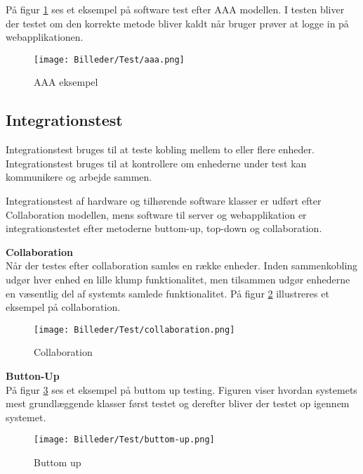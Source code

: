 På  figur \ref{fig:aaa} ses et eksempel på software test efter AAA modellen. I testen bliver der testet om den korrekte metode bliver kaldt når bruger prøver at logge in på webapplikationen. 

\begin{figure}[H]
	\centering
	\texttt{[image: Billeder/Test/aaa.png]}
	\caption{AAA eksempel}
	\label{fig:aaa}
\end{figure}

\newpage

\subsection{Integrationstest} 
Integrationstest bruges til at teste kobling mellem to eller flere enheder. Integrationstest bruges til at kontrollere om enhederne under test kan kommunikere og arbejde sammen. 

Integrationstest af hardware og tilhørende software klasser er udført efter Collaboration modellen, mens software til server og webapplikation er integrationstestet efter metoderne buttom-up, top-down og collaboration. \\

\vspace{-0.4cm}

\textbf{Collaboration}\\
Når der testes efter collaboration samles en række enheder. Inden sammenkobling udgør hver enhed en lille klump funktionalitet, men tilsammen udgør enhederne en væsentlig del af systemts samlede funktionalitet.
På figur \ref{fig:Collaboration} illustreres et eksempel på collaboration.

\vspace{-5pt}
\begin{figure}[H]
	\centering
	\texttt{[image: Billeder/Test/collaboration.png]}
	\vspace{-5pt}
	\caption{Collaboration}
	\label{fig:Collaboration}
\end{figure}


\textbf{Button-Up}\\
På figur \ref{fig:Buttom_up} ses et eksempel på buttom up testing. Figuren viser hvordan systemets mest grundlæggende klasser først testet og derefter bliver der testet op igennem systemet. 

\begin{figure}[H]
	\centering
	\texttt{[image: Billeder/Test/buttom-up.png]}
	\vspace{-5pt}
	\caption{Buttom up}
	\label{fig:Buttom_up}
\end{figure}

